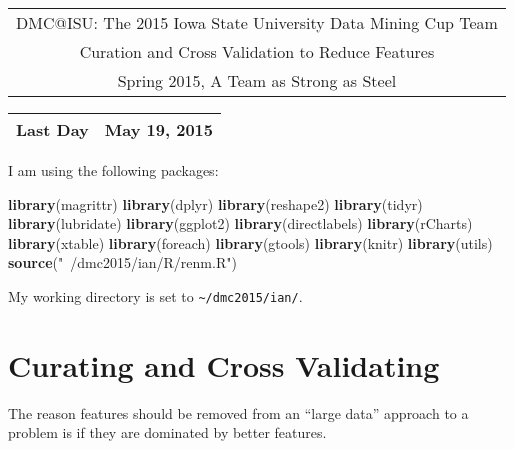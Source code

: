 \documentclass[10pt]{report}
\newenvironment{Shaded}{}{}
\newcommand{\KeywordTok}[1]{\textcolor[rgb]{0.00,0.44,0.13}{\textbf{{#1}}}}
\newcommand{\StringTok}[1]{\textcolor[rgb]{0.25,0.44,0.63}{{#1}}}
\newcommand{\NormalTok}[1]{{#1}}
\begin{document}
\thispagestyle{empty}%
\begin{center}%
    \renewcommand{\arraystretch}{1.5}%
    \begin{tabular}{c}%
       \Large{DMC@ISU: The 2015 Iowa State University Data Mining Cup Team}\\
       Curation and Cross Validation to Reduce Features\\
       Spring 2015, A Team as Strong as Steel \\
    \end{tabular}
\end{center}

\begin{center}
 \renewcommand{\arraystretch}{1.5}
 \begin{tabular*}{0.65\textwidth}{r@{:\hspace{.3cm}}l}
    \hline
    
    
    Last Day&  May 19, 2015\\
    \hline
 \end{tabular*}
\end{center}

I am using the following packages:

\begin{Shaded}
\begin{Highlighting}[]
   \KeywordTok{library}\NormalTok{(magrittr)}
   \KeywordTok{library}\NormalTok{(dplyr)}
   \KeywordTok{library}\NormalTok{(reshape2)}
   \KeywordTok{library}\NormalTok{(tidyr)}
   \KeywordTok{library}\NormalTok{(lubridate)}
   \KeywordTok{library}\NormalTok{(ggplot2)}
   \KeywordTok{library}\NormalTok{(directlabels)}
   \KeywordTok{library}\NormalTok{(rCharts)}
   \KeywordTok{library}\NormalTok{(xtable)}
   \KeywordTok{library}\NormalTok{(foreach)}
   \KeywordTok{library}\NormalTok{(gtools)}
   \KeywordTok{library}\NormalTok{(knitr)}
   \KeywordTok{library}\NormalTok{(utils)}
   \KeywordTok{source}\NormalTok{(}\StringTok{"~/dmc2015/ian/R/renm.R"}\NormalTok{)}
\end{Highlighting}
\end{Shaded}

My working directory is set to \verb!~/dmc2015/ian/!.

\section{Curating and Cross
Validating}\label{curating-and-cross-validating}

The reason features should be removed from an ``large data'' approach to
a problem is if they are dominated by better features.
\end{document}
